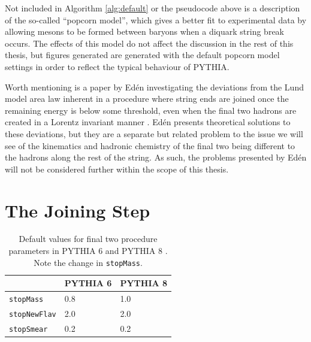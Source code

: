 \documentclass[12pt,a4paper]{report}
\begin{document}
Not included in Algorithm \ref{alg:default} or the pseudocode above is a description of the so-called ``popcorn model'', which gives a better fit to experimental data by allowing mesons to be formed between baryons when a diquark string break occurs. The effects of this model do not affect the discussion in the rest of this thesis, but figures generated are generated with the default popcorn model settings in order to reflect the typical behaviour of PYTHIA.

Worth mentioning is a paper by Ed\'en investigating the deviations from the Lund model area law inherent in a procedure where string ends are joined once the remaining energy is below some threshold, even when the final two hadrons are created in a Lorentz invariant manner \cite{Eden:2000in}. Ed\'en presents theoretical solutions to these deviations, but they are a separate but related problem to the issue we will see of the kinematics and hadronic chemistry of the final two being different to the hadrons along the rest of the string. As such, the problems presented by Ed\'en will not be considered further within the scope of this thesis.

\section{The Joining Step}

\begin{table}[]
  \centering
  \begin{tabular}{l|ll}
    & \textbf{PYTHIA 6} & \textbf{PYTHIA 8} \\ \hline
    \texttt{stopMass}    & 0.8               & 1.0               \\
    \texttt{stopNewFlav} & 2.0               & 2.0               \\
    \texttt{stopSmear}                   & 0.2               & 0.2
  \end{tabular}
  \caption{Default values for final two procedure parameters in PYTHIA 6 and PYTHIA 8 \cite{PYTHIAmanualold,Sjostrand:2006za}. Note the change in \texttt{stopMass}.}
  \label{tab:defaults}
\end{table}
\end{document}
